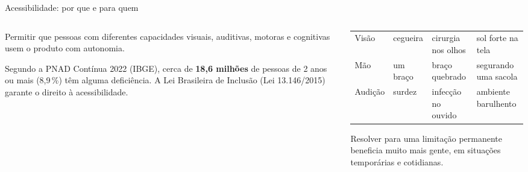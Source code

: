 \documentclass[aspectratio=169,10pt]{beamer}
\begin{document}
\begin{frame}{Acessibilidade: por que e para quem}
  \begin{columns}[T]
    \begin{column}{0.5\textwidth}
      \begin{definicao}
        Permitir que pessoas com diferentes capacidades visuais, auditivas, motoras e cognitivas usem o produto com autonomia.
      \end{definicao}
      \begin{exemplo}[No Brasil]
        Segundo a PNAD Contínua 2022 (IBGE), cerca de \textbf{18,6 milhões} de pessoas de 2 anos ou mais (8,9\,\%) têm alguma deficiência. A Lei Brasileira de Inclusão (Lei 13.146/2015) garante o direito à acessibilidade.
      \end{exemplo}
    \end{column}
    \begin{column}{0.48\textwidth}
      \scriptsize
      \begin{tabularx}{\linewidth}{@{}l L L L@{}}
        \toprule
        &  &  &  \\
        \midrule
        Visão & cegueira & cirurgia nos olhos & sol forte na tela \\
        Mão & um braço & braço quebrado & segurando uma sacola \\
        Audição & surdez & infecção no ouvido & ambiente barulhento \\
        \bottomrule
      \end{tabularx}
      \begin{conceito}
        Resolver para uma limitação permanente beneficia muito mais gente, em situações temporárias e cotidianas.
      \end{conceito}
    \end{column}
  \end{columns}
\end{frame}
\end{document}
